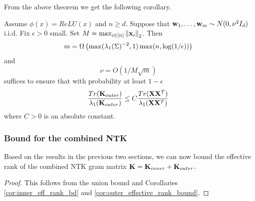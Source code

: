 From the above theorem we get the following corollary.
\begin{corollary}\label{cor:outer_effective_rank_bound}
Assume $\phi(x) = ReLU(x)$ and $n \geq d$.  Suppose that $\mathbf{w}_1, \ldots, \mathbf{w}_m \sim N(0, \nu^2 I_d)$ i.i.d.  Fix $\epsilon > 0$ small.  Set $M = \max_{i \in [n]} \left\lVert\mathbf{x}_i\right\rVert_2$.  Then
\[ m = \Omega\left(\max(\lambda_1(\Sigma)^{-2}, 1) \max(n, \log(1/\epsilon))\right)\]
and
\[ \nu = O(1/M\sqrt{m}) \]
suffices to ensure that with probability at least $1 - \epsilon$
\[\frac{Tr(\mathbf{K}_{outer})}{\lambda_1(\mathbf{K}_{outer})} \leq C \frac{Tr(\mathbf{X} \mathbf{X}^T)}{\lambda_1(\mathbf{X} \mathbf{X}^T)}\]
where $C > 0$ is an absolute constant.
\end{corollary}
\subsubsection{Bound for the combined NTK}
Based on the results in the previous two sections, we can now bound the effective rank of the combined NTK gram matrix $\mathbf{K} = \mathbf{K}_{inner} + \mathbf{K}_{outer}$.
\effrankbd*
\begin{proof}
This follows from the union bound and Corollaries \ref{cor:inner_eff_rank_bd} and \ref{cor:outer_effective_rank_bound}.
\end{proof}


